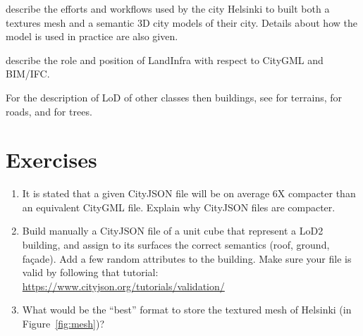 \citet{Helsinki19} describe the efforts and workflows used by the city Helsinki to built both a textures mesh and a semantic 3D city models of their city. 
Details about how the model is used in practice are also given.

\citet{Kumar19} describe the role and position of LandInfra with respect to CityGML and BIM/IFC.

For the description of LoD of other classes then buildings, see \citet{Kumar19} for terrains, \citet{Labetski18} for roads, and \citet{Ortega18} for trees.

%
\section{Exercises}

\begin{enumerate}
  \item It is stated that a given CityJSON file will be on average 6X compacter than an equivalent CityGML file. Explain why CityJSON files are compacter.
  \item Build manually a CityJSON file of a unit cube that represent a LoD2 building, and assign to its surfaces the correct semantics (roof, ground, façade). Add a few random attributes to the building. Make sure your file is valid by following that tutorial: \url{https://www.cityjson.org/tutorials/validation/}
  \item What would be the ``best'' format to store the textured mesh of Helsinki (in Figure~\ref{fig:mesh})?
\end{enumerate}
